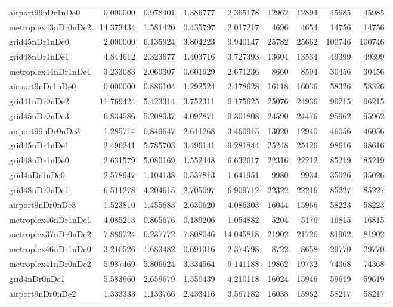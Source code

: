 \begin{longtable}{|l|r|r|r|r|r|r|r|r|}
airport99nDr1nDe0 & 0.000000 & 0.978401 & 1.386777 & 2.365178 & 12962 & 12894 & 45985 & 45985 \\
metroplex43nDr0nDe2 & 14.373434 & 1.581420 & 0.435797 & 2.017217 & 4696 & 4654 & 14756 & 14756 \\
grid45nDr1nDe0 & 2.000000 & 6.135924 & 3.804223 & 9.940147 & 25782 & 25662 & 100746 & 100746 \\
grid48nDr1nDe1 & 4.844612 & 2.323677 & 1.403716 & 3.727393 & 13604 & 13534 & 49399 & 49399 \\
metroplex44nDr1nDe1 & 3.233083 & 2.069307 & 0.601929 & 2.671236 & 8660 & 8594 & 30456 & 30456 \\
airport9nDr1nDe0 & 0.000000 & 0.886104 & 1.292524 & 2.178628 & 16118 & 16036 & 58326 & 58326 \\
grid41nDr0nDe2 & 11.769424 & 5.423314 & 3.752311 & 9.175625 & 25076 & 24936 & 96215 & 96215 \\
grid45nDr0nDe3 & 6.834586 & 5.208937 & 4.092871 & 9.301808 & 24590 & 24476 & 95962 & 95962 \\
airport99nDr0nDe3 & 1.285714 & 0.849647 & 2.611268 & 3.460915 & 13020 & 12940 & 46056 & 46056 \\
grid45nDr1nDe1 & 2.496241 & 5.785703 & 3.496141 & 9.281844 & 25248 & 25126 & 98616 & 98616 \\
grid48nDr1nDe0 & 2.631579 & 5.080169 & 1.552448 & 6.632617 & 22316 & 22212 & 85219 & 85219 \\
grid4nDr1nDe0 & 2.578947 & 1.104138 & 0.537813 & 1.641951 & 9980 & 9934 & 35026 & 35026 \\
grid48nDr0nDe1 & 6.511278 & 4.204615 & 2.705097 & 6.909712 & 22322 & 22216 & 85227 & 85227 \\
airport9nDr0nDe3 & 1.523810 & 1.455683 & 2.630620 & 4.086303 & 16044 & 15966 & 58223 & 58223 \\
metroplex46nDr1nDe1 & 4.085213 & 0.865676 & 0.189206 & 1.054882 & 5204 & 5176 & 16815 & 16815 \\
metroplex37nDr0nDe2 & 7.889724 & 6.237772 & 7.808046 & 14.045818 & 21902 & 21726 & 81902 & 81902 \\
metroplex46nDr1nDe0 & 3.210526 & 1.683482 & 0.691316 & 2.374798 & 8722 & 8658 & 29770 & 29770 \\
metroplex41nDr0nDe2 & 5.987469 & 5.806624 & 3.334564 & 9.141188 & 19862 & 19732 & 74368 & 74368 \\
grid4nDr0nDe1 & 5.583960 & 2.659679 & 1.550439 & 4.210118 & 16024 & 15946 & 59619 & 59619 \\
airport9nDr0nDe2 & 1.333333 & 1.133766 & 2.433416 & 3.567182 & 16038 & 15962 & 58217 & 58217 \\

\end{longtable}
